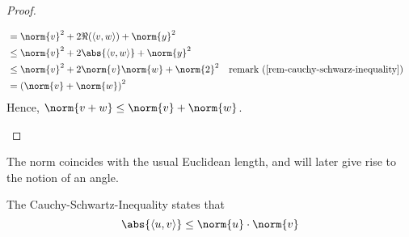 \begin{proof}
\begin{flushleft}
\begin{enumerate}
\begin{align*}
				                   & = \norm{v}^2 + 2\Re(\left<v,w\right>) + \norm{y}^2                                                                                   \\
				                   & \leq \norm{v}^2 + 2\abs{\left<v,w\right>} + \norm{y}^2                                                                               \\
				                   & \leq \norm{v}^2 + 2\norm{v}\norm{w} + \norm{2}^2                            &  & \text{\pref{remark}{rem-cauchy-schwarz-inequality}} \\
				                   & =\left(\norm{v}+\norm{w}\right)^2
			      \end{align*}
			      Hence, $\norm{v+w}\leq\norm{v}+\norm{w}$.
		\end{enumerate}
	\end{flushleft}
\end{proof}

\begin{rem}
	The norm coincides with the usual Euclidean length, and will later give rise
	to the notion of an angle.
\end{rem}

\begin{rem}\label{rem-cauchy-schwarz-inequality}
	The Cauchy-Schwartz-Inequality states that
	\begin{equation}
		\abs{\left<u,v\right>}\leq\norm{u}\cdot\norm{v}
	\end{equation}
\end{rem}

